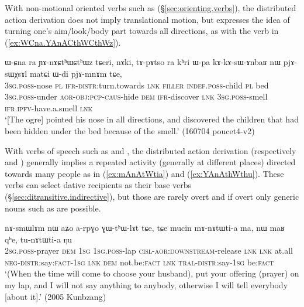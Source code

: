 With non-motional oriented verbs such as  (§\ref{sec:orienting.verbs}), the distributed action derivation does not imply translational motion, but expresses the idea of turning one's aim/look/body part towards all directions, as with the verb  in (\ref{ex:WCna.YAnACthWCthWz}).

\begin{exe}
\ex \label{ex:WCna.YAnACthWCthWz}
\gll  ɯ-ɕna ra ɲɤ-nɤɕtʰɯɕtʰɯz tɕeri, nɤki, tɤ-pɤtso ra kʰri ɯ-pa kɤ-kɤ-sɯ-ɤnbaʁ nɯ pjɤ-sɯχsɤl matɕi ɯ-di pjɤ-mnɤm tɕe, \\
\textsc{3sg}.\textsc{poss}-nose \textsc{pl} \textsc{ifr}-\textsc{distr}:turn.towards \textsc{lnk} \textsc{filler} \textsc{indef}.\textsc{poss}-child \textsc{pl} bed \textsc{3sg}.\textsc{poss}-under \textsc{aor}-\textsc{obj}:\textsc{pcp}-\textsc{caus}-hide \textsc{dem} \textsc{ifr}-discover \textsc{lnk} \textsc{3sg}.\textsc{poss}-smell \textsc{ifr}.\textsc{ipfv}-have.a.smell \textsc{lnk} \\
\glt `[The ogre] pointed his nose in all directions, and discovered the children that had been hidden under the bed because of the smell.' (160704 poucet4-v2)
\end{exe}

With verbs of speech such as  and , the distributed action derivation (respectively  and ) generally implies a repeated activity (generally at different places) directed towards many people as in (\ref{ex:mAnAtWtia}) and (\ref{ex:YAnAthWthu}). These verbs can select dative recipients as their base verbs (§\ref{sec:ditransitive.indirective}), but those are rarely overt and if overt only generic nouns such as  are possible.

\begin{exe}
\ex \label{ex:mAnAtWtia}
\gll  nɤ-smɯlɤm nɯ aʑo a-rpɣo ɣɯ-tʰɯ-lɤt tɕe, tɕe mucin mɤ-nɤtɯti-a ma,
nɯ maʁ qʰe, tu-nɤtɯti-a ŋu \\
\textsc{2sg}.\textsc{poss}-prayer \textsc{dem} \textsc{1sg} \textsc{1sg}.\textsc{poss}-lap \textsc{cisl}-\textsc{aor}:\textsc{downstream}-release \textsc{lnk} \textsc{lnk} at.all \textsc{neg}-\textsc{distr}:say:\textsc{fact}-\textsc{1sg} \textsc{lnk} \textsc{dem} not.be:\textsc{fact} \textsc{lnk} \textsc{tral}-\textsc{distr}:say-\textsc{1sg} be:\textsc{fact} \\
\glt `(When the time will come to choose your husband), put your offering (prayer) on my lap, and I will not say anything to anybody, otherwise I will tell everybody [about it].' (2005 Kunbzang)
\end{exe}

